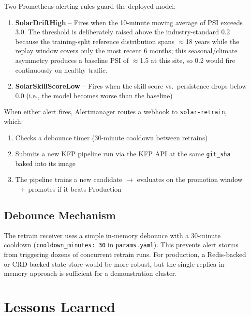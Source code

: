 \documentclass[11pt,a4paper]{article}
\begin{document}
Two Prometheus alerting rules guard the deployed model:

\begin{enumerate}
    \item \textbf{SolarDriftHigh}  --  Fires when the 10-minute moving average of PSI exceeds 3.0. The threshold is deliberately raised above the industry-standard 0.2 because the training-split reference distribution spans $\approx$18 years while the replay window covers only the most recent 6 months; this seasonal/climate asymmetry produces a baseline PSI of $\approx$1.5 at this site, so 0.2 would fire continuously on healthy traffic.
    \item \textbf{SolarSkillScoreLow}  --  Fires when the skill score vs.\ persistence drops below 0.0 (i.e., the model becomes worse than the baseline)
\end{enumerate}

When either alert fires, Alertmanager routes a webhook to \texttt{solar-retrain}, which:

\begin{enumerate}
    \item Checks a debounce timer (30-minute cooldown between retrains)
    \item Submits a new KFP pipeline run via the KFP API at the same \texttt{git\_sha} baked into its image
    \item The pipeline trains a new candidate $\rightarrow$ evaluates on the promotion window $\rightarrow$ promotes if it beats Production
\end{enumerate}

\subsection{Debounce Mechanism}

The retrain receiver uses a simple in-memory debounce with a 30-minute cooldown (\texttt{cooldown\_minutes: 30} in \texttt{params.yaml}). This prevents alert storms from triggering dozens of concurrent retrain runs. For production, a Redis-backed or CRD-backed state store would be more robust, but the single-replica in-memory approach is sufficient for a demonstration cluster.

\section{Lessons Learned}
\end{document}

